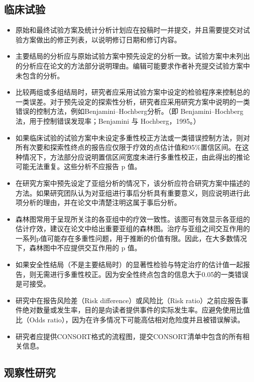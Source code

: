 \documentclass[
  chinese-hans,
  letterpaper,
  DIV=11,
  numbers=noendperiod]{scrreprt}
\begin{document}
\subsection{临床试验}\label{ux4e34ux5e8aux8bd5ux9a8c}

\begin{itemize}
\item
  原始和最终试验方案及统计分析计划应在投稿时一并提交，并且需要提交对试验方案做出的修正列表，以说明修订日期和修订内容。
\item
  主要结局的分析应与原始试验方案中预先设定的分析一致。试验方案中未列出的分析应在论文的方法部分说明理由。编辑可能要求作者补充提交试验方案中未包含的分析。
\item
  比较两组或多组结局时，研究者应采用试验方案中设定的检验程序来控制总的一类误差。对于预先设定的探索性分析，研究者应采用研究方案中说明的一类错误的控制方法，例如Benjamini--Hochberg分析。（即
  Benjamini--Hochberg 法，用于控制错误发现率；Benjamini 与
  Hochberg，1995。）
\item
  如果临床试验的试验方案中未设定多重性校正方法或一类错误控制方法，则对所有次要和探索性终点的报告应仅限于疗效的点估计值和95\%置信区间。在这种情况下，方法部分应说明置信区间宽度未进行多重性校正，由此得出的推论可能无法重复。这些分析不应报告
  p 值。
\item
  在研究方案中预先设定了亚组分析的情况下，该分析应符合研究方案中描述的方法。如果研究团队认为对亚组进行事后分析具有重要意义，则应说明进行此项分析的理由，并在论文中清楚注明这属于事后分析。
\item
  森林图常用于呈现所关注的各亚组中的疗效一致性。该图可有效显示各亚组的估计疗效，建议在论文中给出重要亚组的森林图。治疗与亚组之间交互作用的一系列p值可能存在多重性问题，用于推断的价值有限。因此，在大多数情况下，森林图中不应提供交互作用的
  p 值。
\item
  如果安全性结局（不是主要结局时）的显著性检验与特定治疗的估计值一起报告，则无需进行多重性校正。因为安全性终点包含的信息大于0.05的一类错误是可接受。
\item
  研究中在报告风险差（Risk difference）或风险比（Risk
  ratio）之前应报告事件绝对数量或发生率，目的是向读者提供事件的实际发生率。应避免使用比值比（Odds
  ratio），因为在许多情况下可能高估相对危险度并且被错误解读。
\item
  研究者应提供CONSORT格式的流程图，提交CONSORT清单中包含的所有相关信息。
\end{itemize}

\subsection{观察性研究}\label{ux89c2ux5bdfux6027ux7814ux7a76}
\end{document}
